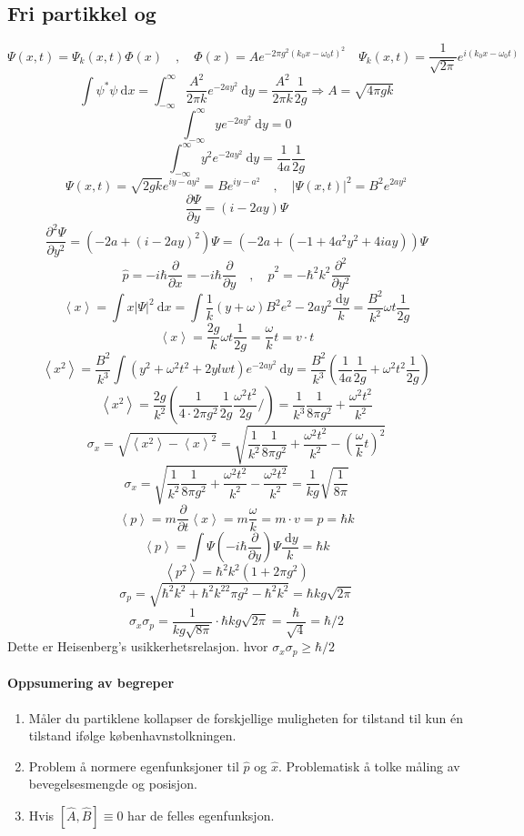 \subsection*{Fri partikkel og }
\[
Ψ(x,t) = Ψ_k(x,t) Φ(x) \quad , \quad  Φ(x) = A e^{- 2πg^2 \left(k_0x - ω_0t\right)^2} \quad Ψ_k(x,t) = \frac{1}{\sqrt{2π}} e^{i(k_0x - ω_0t)}
\] 
\[
∫ ψ^{*}ψ \ \mathrm{d}x = ∫_{-∞}^{∞} \frac{A^2}{2πk}e^{-2ay^2} \ \mathrm{d}y = \frac{A^2}{2πk} \frac{1}{2g} ⇒ A = \sqrt{4πgk}
\]
\[
∫_{-∞}^{∞} ye^{-2ay^2} \ \mathrm{d}y = 0
\]
\[
∫_{-∞}^{∞} y^2e^{-2ay^2} \ \mathrm{d}y = \frac{1}{4a} \frac{1}{2g}
\]
\[
Ψ(x,t) = \sqrt{2gk}e^{iy - ay^2} = Be^{iy - a^2} \quad , \quad \left|Ψ(x,t)\right|^2 = B^2e^{2ay^2}
\]
\[
\frac{∂Ψ}{∂y} = \left(i - 2ay\right)Ψ
\]
\[
\frac{∂^2 Ψ}{∂ y^2} = (-2a + \left(i - 2ay\right)^2)Ψ = \left(-2a + \left(-1 + 4a^2y^2+ 4iay\right)\right)Ψ
\]
\[
\hat{p} = -iℏ \frac{∂}{∂x} = -iℏ \frac{∂}{∂y} \quad , \quad \hat{p}^2 = - ℏ^2k^2 \frac{∂^2 }{∂ y^2}
\]
\[
\left<x\right> = ∫ x \left|Ψ\right|^2 \ \mathrm{d}x = ∫ \frac{1}{k}(y + ω)B^2 e^2-2ay^2 \frac{\ \mathrm{d}y}{k} = \frac{B^2}{k^2} ωt \frac{1}{2g}
\]
\[
\left<x\right> = \frac{2g}{k} ωt \frac{1}{2g} = \frac{ω}{k}t = v ⋅ t
\]
\[
\left<x^2\right> = \frac{B^2}{k^{3}} ∫ \left(y^2 + ω^2t^2 + 2ylwt\right)e^{-2ay^2} \ \mathrm{d}y = \frac{B^2}{k^{3}}\left(\frac{1}{4a} \frac{1}{2g} + ω^2t^2 \frac{1}{2g}\right)
\]
\[
\left<x^2\right> = \frac{2g}{k^2}\left(\frac{1}{4 ⋅ 2πg^2} \frac{1}{2g}\frac{ω^2t^2}{2g}/\right) = \frac{1}{k^3}\frac{1}{8πg^2} + \frac{ω^2t^2}{k^2}
\]
\[
σ_{x} = \sqrt{\left<x^2\right> - \left<x\right>^2} = \sqrt{\frac{1}{k^2}\frac{1}{8πg^2} + \frac{ω^2t^2}{k^2} - \left(\frac{ω}{k}t\right)^2}
\]
\[
σ_{x} = \sqrt{\frac{1}{k^2}\frac{1}{8πg^2} + \frac{ω^2t^2}{k^2} - \frac{ω^2t^2}{k^2}} = \frac{1}{kg}\sqrt{\frac{1}{8π}}
\]
\[
\left<p\right> = m \frac{∂ }{∂ t} \left<x\right> = m \frac{ω}{k} = m ⋅ v = p = ℏk
\]
\[
\left<p\right> = ∫ Ψ\left(- iℏ \frac{∂}{∂y}\right)Ψ \frac{\ \mathrm{d}y}{k} = ℏk
\]
\[
\left<p^2\right> = ℏ^2 k^2 \left(1 + 2πg^2\right)
\]
\[
σ_p = \sqrt{ℏ^2k^2 + ℏ^2k^22πg^2 - ℏ^2k^2} = ℏkg\sqrt{2π}
\]
\[
σ_{x} σ_p = \frac{1}{kg\sqrt{8π}} ⋅ ℏkg\sqrt{2π} = \frac{ℏ}{\sqrt{4}} = ℏ/2 
\]
Dette er Heisenberg's usikkerhetsrelasjon. hvor $σ_x σ_p \ge ℏ / 2$

\paragraph{Oppsumering av begreper}
\begin{enumerate}
    \item 
    Måler du partiklene kollapser de forskjellige muligheten for tilstand til kun én tilstand ifølge københavnstolkningen. 
    \item Problem å normere egenfunksjoner til $\hat{p}$ og $\hat{x}$. Problematisk å tolke måling av bevegelsesmengde og posisjon. 
    \item Hvis $\left[\hat{A},\hat{B}\right] ≡ 0$ har de felles egenfunksjon. 
\end{enumerate}